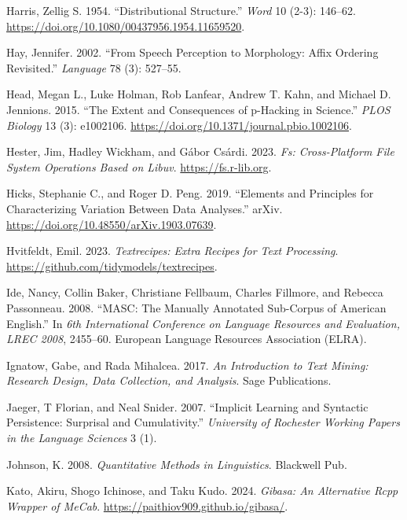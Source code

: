 \documentclass[
  letterpaper,
]{latex/krantz}
\newlength{\cslhangindent}
\newenvironment{CSLReferences}[2] %
 {\begin{list}{}{%
  \setlength{\itemindent}{0pt}
  \setlength{\leftmargin}{0pt}
  \setlength{\parsep}{0pt}
  \ifodd #1
   \setlength{\leftmargin}{\cslhangindent}
   \setlength{\itemindent}{-1\cslhangindent}
  \fi
  \setlength{\itemsep}{#2\baselineskip}}}
 {\end{list}}
\theoremstyle{definition}
\theoremstyle{remark}
\begin{document}
\begin{CSLReferences}{1}{0}
Harris, Zellig S. 1954. {``Distributional Structure.''} \emph{Word} 10
(2-3): 146--62. \url{https://doi.org/10.1080/00437956.1954.11659520}.

Hay, Jennifer. 2002. {``From Speech Perception to Morphology: Affix
Ordering Revisited.''} \emph{Language} 78 (3): 527--55.

Head, Megan L., Luke Holman, Rob Lanfear, Andrew T. Kahn, and Michael D.
Jennions. 2015. {``The Extent and Consequences of p-Hacking in
Science.''} \emph{PLOS Biology} 13 (3): e1002106.
\url{https://doi.org/10.1371/journal.pbio.1002106}.

Hester, Jim, Hadley Wickham, and Gábor Csárdi. 2023. \emph{Fs:
Cross-Platform File System Operations Based on Libuv}.
\url{https://fs.r-lib.org}.

Hicks, Stephanie C., and Roger D. Peng. 2019. {``Elements and Principles
for Characterizing Variation Between Data Analyses.''} arXiv.
\url{https://doi.org/10.48550/arXiv.1903.07639}.

Hvitfeldt, Emil. 2023. \emph{Textrecipes: Extra Recipes for Text
Processing}. \url{https://github.com/tidymodels/textrecipes}.

Ide, Nancy, Collin Baker, Christiane Fellbaum, Charles Fillmore, and
Rebecca Passonneau. 2008. {``MASC: The Manually Annotated Sub-Corpus of
American English.''} In \emph{6th International Conference on Language
Resources and Evaluation, LREC 2008}, 2455--60. European Language
Resources Association (ELRA).

Ignatow, Gabe, and Rada Mihalcea. 2017. \emph{An Introduction to Text
Mining: Research Design, Data Collection, and Analysis}. Sage
Publications.

Jaeger, T Florian, and Neal Snider. 2007. {``Implicit Learning and
Syntactic Persistence: Surprisal and Cumulativity.''} \emph{University
of Rochester Working Papers in the Language Sciences} 3 (1).

Johnson, K. 2008. \emph{Quantitative Methods in Linguistics}. Blackwell
Pub.

Kato, Akiru, Shogo Ichinose, and Taku Kudo. 2024. \emph{Gibasa: An
Alternative Rcpp Wrapper of MeCab}.
\url{https://paithiov909.github.io/gibasa/}.


\end{CSLReferences}
\end{document}
